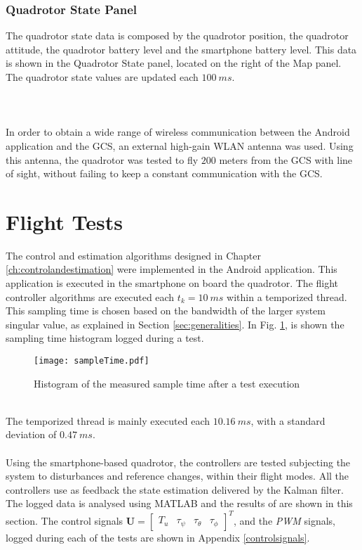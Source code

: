\subsubsection*{Quadrotor State Panel}
The quadrotor state data is composed by the quadrotor position, the quadrotor attitude, the quadrotor battery level and the smartphone battery level. This data is shown in the Quadrotor State panel, located on the right of the Map panel. The quadrotor state values are updated each $100\ ms$.
\\\\\\\\
In order to obtain a wide range of wireless communication between the Android application and the GCS, an external high-gain WLAN antenna was used. Using this antenna, the quadrotor was tested to fly $200$ meters from the GCS with line of sight, without failing to keep a constant communication with the GCS.

\section{Flight Tests} \label{sec:tests}
The control and estimation algorithms designed in Chapter \ref{ch:controlandestimation} were implemented in the Android application. This application is executed in the smartphone on board the quadrotor. The flight controller algorithms are executed each $t_k = 10\ ms$ within a temporized thread. This sampling time is chosen based on the bandwidth of the larger system singular value, as explained in Section \ref{sec:generalities}. In Fig. \ref{fig:sampletime}, is shown the sampling time histogram logged during a test.
\begin{figure}[h]
	\begin{center}
		\texttt{[image: sampleTime.pdf]}    
		\caption{Histogram of the measured sample time after a test execution} 
		\label{fig:sampletime}
	\end{center}
\end{figure}
\\The temporized thread is mainly executed each $10.16\ ms$, with a standard deviation of $0.47\ ms$.
\\\\
Using the smartphone-based quadrotor, the controllers are tested subjecting the system to disturbances and reference changes, within their flight modes. All the controllers use as feedback the state estimation delivered by the Kalman filter. The logged data is analysed using MATLAB and the results of are shown in this section. The control signals $\mathbf{U} = \begin{bmatrix}
T_u & \tau_\psi & \tau_\theta & \tau_\phi
\end{bmatrix}^{T}$, and the \textit{PWM} signals, logged during each of the tests are shown in Appendix \ref{controlsignals}.
